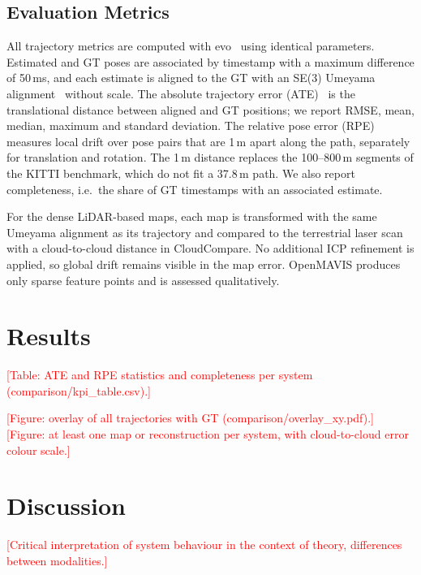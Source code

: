 \documentclass[conference]{IEEEtran}
\newcommand{\todo}[1]{\textcolor{red}{[#1]}}
\begin{document}
\subsection{Evaluation Metrics}
All trajectory metrics are computed with evo~\cite{grupp2017evo} using identical parameters.
Estimated and GT poses are associated by timestamp with a maximum difference of 50\,ms, and
each estimate is aligned to the GT with an SE(3) Umeyama alignment~\cite{umeyama1991} without
scale. The absolute trajectory error (ATE)~\cite{sturm2012tum} is the translational distance
between aligned and GT positions; we report RMSE, mean, median, maximum and standard deviation.
The relative pose error (RPE)~\cite{sturm2012tum} measures local drift over pose pairs that are
1\,m apart along the path, separately for translation and rotation. The 1\,m distance replaces
the 100--800\,m segments of the KITTI benchmark, which do not fit a 37.8\,m path. We also report
completeness, i.e.\ the share of GT timestamps with an associated estimate.

For the dense LiDAR-based maps, each map is transformed with the same Umeyama alignment as its
trajectory and compared to the terrestrial laser scan with a cloud-to-cloud distance in
CloudCompare. No additional ICP refinement is applied, so global drift remains visible in the
map error. OpenMAVIS produces only sparse feature points and is assessed qualitatively.

\section{Results}
\todo{Table: ATE and RPE statistics and completeness per system (comparison/kpi\_table.csv).}

\todo{Figure: overlay of all trajectories with GT (comparison/overlay\_xy.pdf).}
\todo{Figure: at least one map or reconstruction per system, with cloud-to-cloud error colour scale.}

\section{Discussion}
\todo{Critical interpretation of system behaviour in the context of theory, differences between modalities.}
\end{document}
